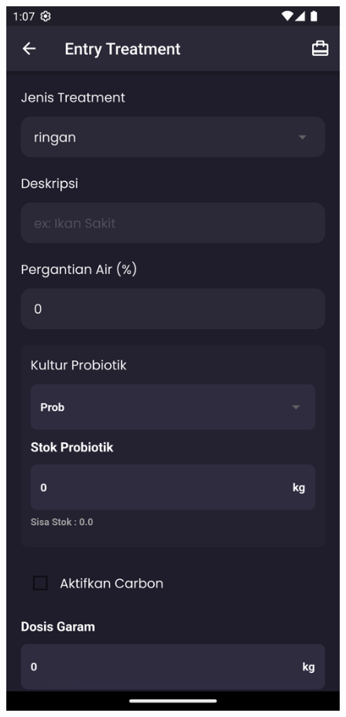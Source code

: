 \begin{spacing}{1.5}
\begin{enumerate}
		\begin{figure}[H]
				\includegraphics[width=\linewidth]{gambar/sprint4/treat_1.png}

\end{figure}
\end{enumerate}
\end{spacing}
